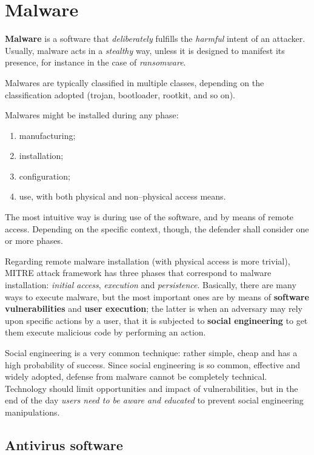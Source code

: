 \documentclass[10pt]{extbook}
\begin{document}
\section{Malware}

\textbf{Malware} is a software that \emph{deliberately} fulfills the
\emph{harmful} intent of an attacker. Usually, malware acts in a
\emph{stealthy} way, unless it is designed to manifest its presence, for
instance in the case of \emph{ransomware}.

Malwares are typically classified in multiple classes, depending on the
classification adopted (trojan, bootloader, rootkit, and so on).

Malwares might be installed during any phase:
\begin{enumerate}
    \item manufacturing;
    \item installation;
    \item configuration;
    \item use, with both physical and non--physical access means.
\end{enumerate}

The most intuitive way is during use of the software, and by means of remote
access. Depending on the specific context, though, the defender shall consider
one or more phases.

Regarding remote malware installation (with physical access is more trivial),
MITRE attack framework has three phases that correspond to malware
installation: \emph{initial access}, \emph{execution} and \emph{persistence}.
Basically, there are many ways to execute malware, but the most important ones
are by means of \textbf{software vulnerabilities} and \textbf{user execution};
the latter is when an adversary may rely upon specific actions by a user, that
it is subjected to \textbf{social engineering} to get them execute malicious
code by performing an action.

Social engineering is a very common technique: rather simple, cheap and has a
high probability of success. Since social engineering is so common, effective
and widely adopted, defense from malware cannot be completely technical.
Technology should limit opportunities and impact of vulnerabilities, but in the
end of the day \emph{users need to be aware and educated} to prevent social
engineering manipulations.

\subsection{Antivirus software}
\end{document}

